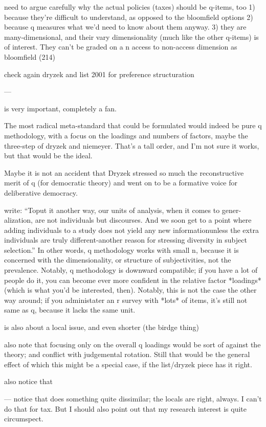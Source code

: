 need to argue carefully why the actual policies (taxes) should be q-items, too
1) because they're difficult to understand, as opposed to the bloomfield options
2) because q measures what we'd need to know about them anyway.
3) they are many-dimensional, and their vary dimensionality (much like the other q-items) is of interest. They can't be graded on a n access to non-access dimension as bloomfield (214)

check again dryzek and list 2001 for preference structuration

---

\cite{Dryzek1993} is very important, completely a fan.

The most radical meta-standard that could be formulated would indeed be pure q methodology, with a focus on the loadings and numbers of factors, maybe the three-step of dryzek and niemeyer. That's a tall order, and I'm not sure it works, but that would be the ideal.

Maybe it is not an accident that Dryzek stressed so much the reconstructive merit of q (for democratic theory) and went on to be a formative voice for deliberative democracy.

\cite[52]{Dryzek1993} write: ``Toput it another way, our units of analysis, when it comes to gener- alization, are not individuals but discourses. And we soon get to a point where adding individuals to a study does not yield any new informationunless the extra individuals are truly different-another reason for stressing diversity in subject selection.''
In other words, q methodology works with small n, because it is concerned with the dimensionality, or structure of subjectivities, not the prevalence. Notably, q methodology is downward compatible; if you have a lot of people do it, you can become ever more confident in the relative factor *loadings* (which is what you'd be interested, then). Notably, this is not the case the other way around; if you administater an r survey with *lots* of items, it's still not same as q, because it lacks the same unit.

\cite{Niemeyer2013} is also about a local issue, and even shorter (the birdge thing)

also note that focusing only on the overall q loadings would be sort of against the theory; and conflict with judgemental rotation. Still that would be the general effect of which this might be a special case, if the list/dryzek piece has it right.

also notice that

---
notice that \cite{Brown-2006} does something quite dissimilar; the locals are right, always. I can't do that for tax.
But I should also point out that my research interest is quite circumspect.

